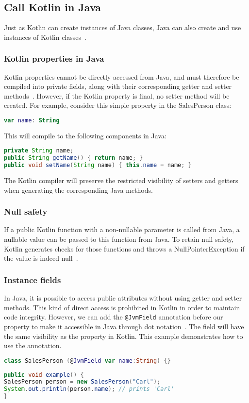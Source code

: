 \documentclass[a4paper,11pt]{article}
\begin{document}
\subsection{Call Kotlin in Java}
Just as Kotlin can create instances of Java classes, Java can also create and use instances of Kotlin classes~\cite{interop-java}.

\subsubsection{Kotlin properties in Java}
Kotlin properties cannot be directly accessed from Java, and must therefore be compiled into private fields, along with their corresponding getter and setter methods~\cite{interop-properties}. However, if the Kotlin property is final, no setter method will be created. For example, consider this simple property in the SalesPerson class:
\begin{lstlisting}[language=Kotlin]
var name: String
\end{lstlisting}
This will compile to the following components in Java:
\begin{lstlisting}[language=Java]
private String name;
public String getName() { return name; }
public void setName(String name) { this.name = name; }
\end{lstlisting}
The Kotlin compiler will preserve the restricted visibility of setters and getters when generating the corresponding Java methods.

\subsubsection{Null safety} %
If a public Kotlin function with a non-nullable parameter is called from Java, a nullable value can be passed to this function from Java. To retain null safety, Kotlin generates checks for those functions and throws a NullPointerException if the value is indeed null~\cite{interop-java-null-safety}.

\subsubsection{Instance fields}
In Java, it is possible to access public attributes without using getter and setter methods. This kind of direct access is prohibited in Kotlin in order to maintain code integrity. However, we can add the \texttt{@JvmField} annotation before our property to make it accessible in Java through dot notation~\cite{interop-instance-fields}. The field will have the same visibility as the property in Kotlin.
This example demonstrates how to use the annotation.
\begin{lstlisting}[language=Kotlin]
class SalesPerson (@JvmField var name:String) {}
\end{lstlisting}
\begin{lstlisting}[language=Java]
public void example() {
SalesPerson person = new SalesPerson("Carl");
System.out.println(person.name); // prints 'Carl'
}
\end{lstlisting}
\end{document}
